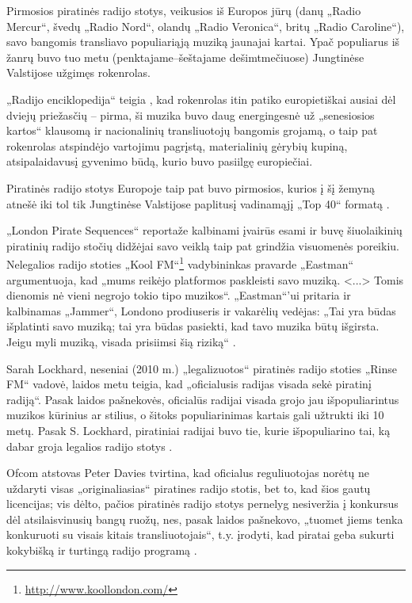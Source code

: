 \documentclass[kursinis-darbas]{vukf}
\begin{document}
Pirmosios piratinės radijo stotys, veikusios iš Europos jūrų (danų „Radio Mercur“, švedų „Radio Nord“, olandų „Radio Veronica“, britų „Radio Caroline“), savo bangomis transliavo populiariąją muziką jaunajai kartai. Ypač populiarus iš žanrų buvo tuo metu (penktajame--šeštajame dešimtmečiuose) Jungtinėse Valstijose užgimęs rokenrolas.

„Radijo enciklopedija“ teigia \cite[p.~237]{chs_encyclopedia_of_radio}, kad rokenrolas itin patiko europietiškai ausiai dėl dviejų priežasčių – pirma, ši muzika buvo daug energingesnė už „senesiosios kartos“ klausomą ir nacionalinių transliuotojų bangomis grojamą, o taip pat rokenrolas atspindėjo vartojimu pagrįstą, materialinių gėrybių kupiną, atsipalaidavusį gyvenimo būdą, kurio buvo pasiilgę europiečiai.

Piratinės radijo stotys Europoje taip pat buvo pirmosios, kurios į šį žemyną atnešė iki tol tik Jungtinėse Valstijose paplitusį vadinamąjį „Top 40“ formatą \cite[p.~237]{chs_encyclopedia_of_radio}.

„London Pirate Sequences“ reportaže kalbinami įvairūs esami ir buvę šiuolaikinių piratinių radijo stočių didžėjai savo veiklą taip pat grindžia visuomenės poreikiu. Nelegalios radijo stoties „Kool FM“\footnote{\url{http://www.koollondon.com/}} vadybininkas pravarde „Eastman“ argumentuoja, kad „mums reikėjo platformos paskleisti savo muziką. <...> Tomis dienomis nė vieni negrojo tokio tipo muzikos“. „Eastman“'ui pritaria ir kalbinamas „Jammer“, Londono prodiuseris ir vakarėlių vedėjas: „Tai yra būdas išplatinti savo muziką; tai yra būdas pasiekti, kad tavo muzika būtų išgirsta. Jeigu myli muziką, visada prisiimsi šią riziką“ \cite{vice_london_pirate_sequences}.

Sarah Lockhard, neseniai (2010 m.) „legalizuotos“ piratinės radijo stoties „Rinse FM“ vadovė, laidos metu teigia, kad „oficialusis radijas visada sekė piratinį radiją“. Pasak laidos pašnekovės, oficialūs radijai visada grojo jau išpopuliarintus muzikos kūrinius ar stilius, o šitoks populiarinimas kartais gali užtrukti iki 10 metų. Pasak S. Lockhard, piratiniai radijai buvo tie, kurie išpopuliarino tai, ką dabar groja legalios radijo stotys \cite{bbc_radio_4_do_pirates_rule_the_air_waves}.

\gls{Ofcom} atstovas Peter Davies tvirtina, kad oficialus reguliuotojas norėtų ne uždaryti visas „originaliasias“ piratines radijo stotis, bet to, kad šios gautų licencijas; vis dėlto, pačios piratinės radijo stotys pernelyg nesiveržia į konkursus dėl atsilaisvinusių bangų ruožų, nes, pasak laidos pašnekovo, „tuomet jiems tenka konkuruoti su visais kitais transliuotojais“, t.y. įrodyti, kad piratai geba sukurti kokybišką ir turtingą radijo programą \cite{bbc_radio_4_do_pirates_rule_the_air_waves}.
\end{document}
